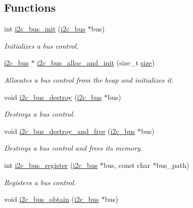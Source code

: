 \subsection*{Functions}
\begin{DoxyCompactItemize}
\item 
int \mbox{\hyperlink{group__I2CBus_ga53427f41c12b16e164f944d99b7a9a25}{i2c\+\_\+bus\+\_\+init}} (\mbox{\hyperlink{structi2c__bus}{i2c\+\_\+bus}} $\ast$bus)
\begin{DoxyCompactList}\small\item\em Initializes a bus control. \end{DoxyCompactList}\item 
\mbox{\hyperlink{structi2c__bus}{i2c\+\_\+bus}} $\ast$ \mbox{\hyperlink{group__I2CBus_gaf66a22612850bee468de351d1635f28a}{i2c\+\_\+bus\+\_\+alloc\+\_\+and\+\_\+init}} (size\+\_\+t \mbox{\hyperlink{sun4u_2tte_8h_a245260f6f74972558f61b85227df5aae}{size}})
\begin{DoxyCompactList}\small\item\em Allocates a bus control from the heap and initializes it. \end{DoxyCompactList}\item 
void \mbox{\hyperlink{group__I2CBus_ga000d6042dcb980798aa8358dbdd5cfba}{i2c\+\_\+bus\+\_\+destroy}} (\mbox{\hyperlink{structi2c__bus}{i2c\+\_\+bus}} $\ast$bus)
\begin{DoxyCompactList}\small\item\em Destroys a bus control. \end{DoxyCompactList}\item 
void \mbox{\hyperlink{group__I2CBus_ga174d189593676d0053ca88bc6edb238d}{i2c\+\_\+bus\+\_\+destroy\+\_\+and\+\_\+free}} (\mbox{\hyperlink{structi2c__bus}{i2c\+\_\+bus}} $\ast$bus)
\begin{DoxyCompactList}\small\item\em Destroys a bus control and frees its memory. \end{DoxyCompactList}\item 
int \mbox{\hyperlink{group__I2CBus_ga6987c0edf1d40adf54d2689fed47c3cf}{i2c\+\_\+bus\+\_\+register}} (\mbox{\hyperlink{structi2c__bus}{i2c\+\_\+bus}} $\ast$bus, const char $\ast$bus\+\_\+path)
\begin{DoxyCompactList}\small\item\em Registers a bus control. \end{DoxyCompactList}\item 
void \mbox{\hyperlink{group__I2CBus_ga18a5b66cdf62e17b8610b99cf8fef086}{i2c\+\_\+bus\+\_\+obtain}} (\mbox{\hyperlink{structi2c__bus}{i2c\+\_\+bus}} $\ast$bus)

\end{DoxyCompactItemize}
